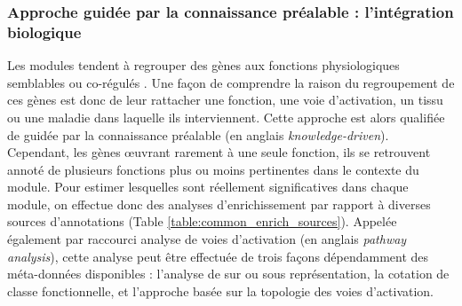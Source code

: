 \subsubsection{Approche guidée par la connaissance préalable : l'intégration biologique}

Les modules tendent à regrouper des gènes aux fonctions physiologiques semblables ou co-régulés \cite{Barabasi2011Jan,Lorenz2011}. Une façon de comprendre la raison du regroupement de ces gènes est donc de leur rattacher une fonction, une voie d'activation, un tissu ou une maladie dans laquelle ils interviennent. Cette approche est alors qualifiée de guidée par la connaissance préalable (en anglais \textit{knowledge-driven}). Cependant, les gènes œuvrant rarement à une seule fonction, ils se retrouvent annoté de plusieurs fonctions \cite{Green2006Aug} plus ou moins pertinentes dans le contexte du module. Pour estimer lesquelles sont réellement significatives dans chaque module, on effectue donc des analyses d'enrichissement \cite{Khatri2012} par rapport à diverses sources d'annotations (Table \ref{table:common_enrich_sources}). Appelée également par raccourci analyse de voies d'activation (en anglais \textit{pathway analysis}), cette analyse peut être effectuée de trois façons dépendamment des méta-données disponibles : l'analyse de sur ou sous représentation, la cotation de classe fonctionnelle, et l'approche basée sur la topologie des voies d'activation. 


